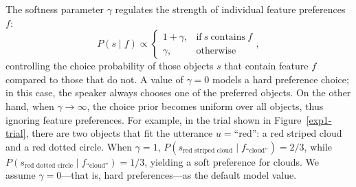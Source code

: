\documentclass[10pt,a4paper]{article}
\begin{document}
The softness parameter $\gamma$ regulates the strength of individual feature preferences $f$:
$$ P(s \mid f) \propto \begin{cases}
1 + \gamma, & \text{if}\ s\ \text{contains}\ f \\
\gamma, & \text{otherwise}
\end{cases},$$
controlling the choice probability of those objects $s$ that contain feature $f$ compared to those that do not.  
A value of $\gamma=0$ models a hard preference choice; in this case, the speaker always chooses one of the preferred objects. 
On the other hand, when $\gamma \rightarrow \infty$, the choice prior becomes uniform over all objects, thus ignoring feature preferences. 
 For example, in the trial shown in Figure~\ref{exp1-trial}, there are two objects that fit the utterance $u=\text{``red''}$: a red striped cloud and a red dotted circle.
 When $\gamma=1$, $P(s_{\textrm{red\ striped\ cloud}}\mid f_{\textrm{``cloud''}}) = 2/3$, while
 $P(s_{\textrm{red\ dotted\ circle}}\mid f_{\textrm{``cloud''}})= 1/3$, yielding a soft preference for clouds.
 We assume $\gamma=0$---that is, hard preferences---as the default model value.
\end{document}
